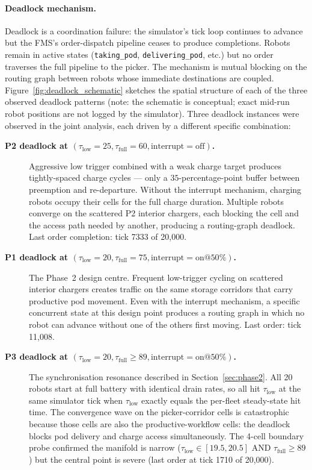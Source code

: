 \documentclass[conference]{IEEEtran}
\begin{document}
\begin{description}
\end{description}

\paragraph{Deadlock mechanism.}
Deadlock is a coordination failure: the simulator's tick loop continues to advance but the FMS's order-dispatch pipeline ceases to produce completions. Robots remain in active states (\texttt{taking\_pod}, \texttt{delivering\_pod}, etc.) but no order traverses the full pipeline to the picker. The mechanism is mutual blocking on the routing graph between robots whose immediate destinations are coupled. Figure~\ref{fig:deadlock_schematic} sketches the spatial structure of each of the three observed deadlock patterns (note: the schematic is conceptual; exact mid-run robot positions are not logged by the simulator). Three deadlock instances were observed in the joint analysis, each driven by a different specific combination:

\begin{description}
  \item[\textbf{P2 deadlock at $(\tau_\text{low}=25, \tau_\text{full}=60, \text{interrupt}=\text{off})$.}] Aggressive low trigger combined with a weak charge target produces tightly-spaced charge cycles --- only a $35$-percentage-point buffer between preemption and re-departure. Without the interrupt mechanism, charging robots occupy their cells for the full charge duration. Multiple robots converge on the scattered P2 interior chargers, each blocking the cell and the access path needed by another, producing a routing-graph deadlock. Last order completion: tick 7333 of 20{,}000.
  \item[\textbf{P1 deadlock at $(\tau_\text{low}=20, \tau_\text{full}=75, \text{interrupt}=\text{on}@50\%)$.}] The Phase~2 design centre. Frequent low-trigger cycling on scattered interior chargers creates traffic on the same storage corridors that carry productive pod movement. Even with the interrupt mechanism, a specific concurrent state at this design point produces a routing graph in which no robot can advance without one of the others first moving. Last order: tick 11{,}008.
  \item[\textbf{P3 deadlock at $(\tau_\text{low}=20, \tau_\text{full}\ge 89, \text{interrupt}=\text{on}@50\%)$.}] The synchronisation resonance described in Section~\ref{sec:phase2}. All 20 robots start at full battery with identical drain rates, so all hit $\tau_\text{low}$ at the same simulator tick when $\tau_\text{low}$ exactly equals the per-fleet steady-state hit time. The convergence wave on the picker-corridor cells is catastrophic because those cells are also the productive-workflow cells: the deadlock blocks pod delivery and charge access simultaneously. The 4-cell boundary probe confirmed the manifold is narrow ($\tau_\text{low} \in [19.5, 20.5]$ AND $\tau_\text{full} \ge 89$) but the central point is severe (last order at tick 1710 of 20{,}000).
\end{description}
\end{document}
